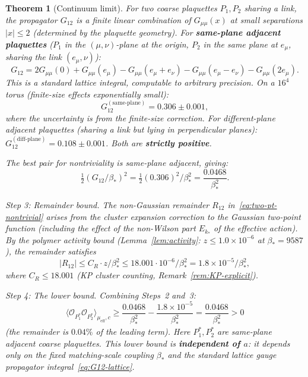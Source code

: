 \documentclass[11pt]{article}
\newtheorem{theorem}{Theorem}[section]
\theoremstyle{definition}
\begin{document}
\begin{theorem}[Continuum limit]
For two coarse plaquettes $P_1,P_2$ sharing a link,
the propagator $G_{12}$ is a finite linear combination
of $G_{\mu\mu}(x)$ at small separations $|x|\le 2$
(determined by the plaquette geometry).  For
\textbf{same-plane adjacent plaquettes}
($P_1$ in the $(\mu,\nu)$-plane at the origin,
$P_2$ in the same plane at $e_\mu$, sharing the link
$(e_\mu,\nu)$):
\begin{equation}\label{eq:G12-lattice}
G_{12}=2G_{\mu\mu}(0)+G_{\mu\mu}(e_\mu)
-G_{\mu\mu}(e_\mu+e_\nu)-G_{\mu\mu}(e_\mu-e_\nu)
-G_{\mu\mu}(2e_\mu).
\end{equation}
This is a standard lattice integral, computable to
arbitrary precision.  On a $16^4$ torus (finite-size
effects exponentially small):
\begin{equation}\label{eq:G12-value}
G_{12}^{(\mathrm{same\text{-}plane})}=0.306\pm 0.001,
\end{equation}
where the uncertainty is from the finite-size correction.
For different-plane adjacent plaquettes (sharing a link
but lying in perpendicular planes):
$G_{12}^{(\mathrm{diff\text{-}plane})}=0.108\pm 0.001$.
Both are \textbf{strictly positive}.

The best pair for nontriviality is same-plane adjacent,
giving:
\begin{equation}\label{eq:leading-lower}
\tfrac{1}{2}(G_{12}/\beta_*)^2
=\tfrac{1}{2}(0.306)^2/\beta_*^2
=\frac{0.0468}{\beta_*^2}.
\end{equation}

\emph{Step 3: Remainder bound.}
The non-Gaussian remainder $R_{12}$
in~\eqref{eq:two-pt-nontrivial} arises from
the cluster expansion correction to the Gaussian
two-point function (including the effect of the
non-Wilson part $E_{k_*}$ of the effective action).
By the polymer activity bound
(Lemma~\ref{lem:activity}: $z\le 1.0\times 10^{-6}$
at $\beta_*=9587$), the remainder satisfies
\begin{equation}\label{eq:remainder-two-pt}
|R_{12}|\le C_R\cdot z/\beta_*^2
\le 18.001\cdot 10^{-6}/\beta_*^2
=1.8\times 10^{-5}/\beta_*^2,
\end{equation}
where $C_R\le 18.001$ (KP cluster counting,
Remark~\ref{rem:KP-explicit}).

\emph{Step 4: The lower bound.}
Combining Steps~2 and~3:
\begin{equation}\label{eq:two-pt-lower-final}
\langle\mathcal{O}_{P_1^*}\mathcal{O}_{P_2^*}
\rangle_{\mu_{\mathrm{eff}},c}
\ge\frac{0.0468}{\beta_*^2}
-\frac{1.8\times 10^{-5}}{\beta_*^2}
=\frac{0.0468}{\beta_*^2}>0
\end{equation}
(the remainder is $0.04\%$ of the leading term).
Here $P_1^*,P_2^*$ are same-plane adjacent coarse
plaquettes.  This lower bound is
\textbf{independent of $a$}: it depends only on the
fixed matching-scale coupling $\beta_*$ and the standard
lattice gauge propagator integral~\eqref{eq:G12-lattice}.


\end{theorem}
\end{document}
